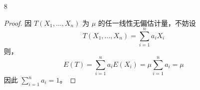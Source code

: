 \documentclass[normal,cn]{elegantnote}
\begin{document}
\begin{enumerate}
\begin{proof}
            同时，
            \begin{gather*}
                \operatorname{Var}\left(4X_{(1)}\right)=16\cdot\left[\frac{\theta^{2}}{10}-\left(\frac{\theta}{4}\right)^{2}\right]=\frac{3\theta^{2}}{5} \\
                \operatorname{Var}\left(\frac{4}{3}X_{(3)}\right)=\frac{16}{9}\cdot\left[\frac{3\theta^{2}}{5}-\left(\frac{3\theta}{4}\right)^{2}\right]=\frac{\theta^{2}}{15}
            \end{gather*}
            故，$\operatorname{Var}\left(4X_{(1)}\right)>\operatorname{Var}\left(\frac{4}{3}X_{(3)}\right)$，即 $\frac{4}{3}X_{(3)}$ 比 $4X_{(1)}$ 更有效。
        \end{proof}
    \item[8]
        \begin{proof}
            因 $T\left(X_{1},\ldots,X_{n}\right)$ 为 $\mu$ 的任一线性无偏估计量，不妨设
            \begin{equation*}
                T\left(X_{1},\ldots,X_{n}\right)=\sum_{i=1}^{n}a_{i}X_{i}
            \end{equation*}
            则，
            \begin{equation*}
                E(T)=\sum_{i=1}^{n}a_{i}E\left(X_{i}\right)=\mu\sum_{i=1}^{n}a_{i}=\mu
            \end{equation*}
            因此 $\sum_{i=1}^{n}a_{i}=1$。


\end{proof}
\end{enumerate}
\end{document}
